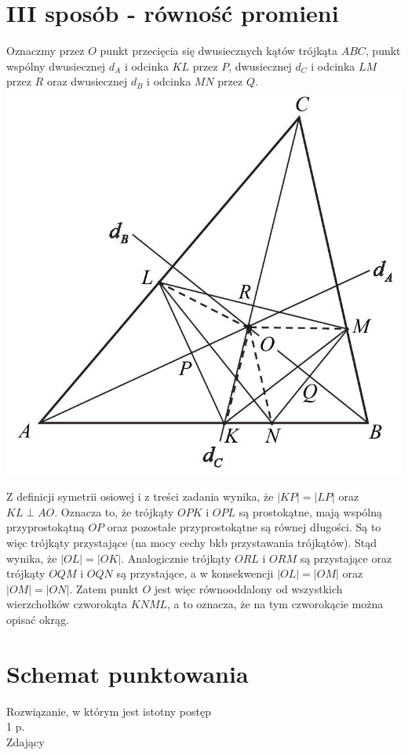 \documentclass[10pt]{article}
\begin{document}
\section*{III sposób - równość promieni}
Oznaczmy przez $O$ punkt przecięcia się dwusiecznych kątów trójkąta $A B C$, punkt wspólny dwusiecznej $d_{A}$ i odcinka $K L$ przez $P$, dwusiecznej $d_{C}$ i odcinka $L M$ przez $R$ oraz dwusiecznej $d_{B}$ i odcinka $M N$ przez $Q$.\\
\includegraphics[max width=\textwidth, center]{2025_02_07_a13180f11f288af0ed0dg-07}

Z definicji symetrii osiowej i z treści zadania wynika, że $|K P|=|L P|$ oraz $K L \perp A O$. Oznacza to, że trójkąty $O P K$ i $O P L$ są prostokątne, mają wspólną przyprostokątną $O P$ oraz pozostałe przyprostokątne są równej długości. Są to więc trójkąty przystające (na mocy cechy bkb przystawania trójkątów). Stąd wynika, że $|O L|=|O K|$. Analogicznie trójkąty $O R L$ i $O R M$ są przystające oraz trójkąty $O Q M$ i $O Q N$ są przystające, a w konsekwencji $|O L|=|O M|$ oraz $|O M|=|O N|$. Zatem punkt $O$ jest więc równooddalony od wszystkich wierzchołków czworokąta $K N M L$, a to oznacza, że na tym czworokącie można opisać okrąg.

\section*{Schemat punktowania}
Rozwiązanie, w którym jest istotny postęp\\
1 p.\\
Zdający
\end{document}

